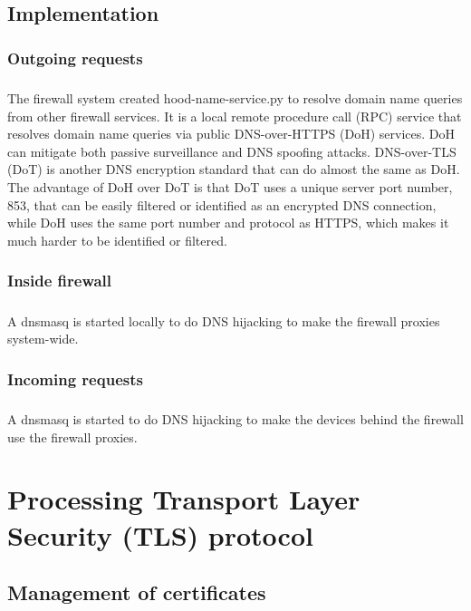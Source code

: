 \documentclass[mscthesis]{usiinfthesis}
\begin{document}
\section{Implementation}
\subsection{Outgoing requests}
\paragraph{}
The firewall system created hood-name-service.py to resolve domain name queries from other firewall services. It is a local remote procedure call (RPC) service that resolves domain name queries via public DNS-over-HTTPS (DoH) services. DoH can mitigate both passive surveillance and DNS spoofing attacks\citep{rfc:doh8}. DNS-over-TLS (DoT) is another DNS encryption standard that can do almost the same as DoH. The advantage of DoH over DoT is that DoT uses a unique server port number, 853, that can be easily filtered or identified as an encrypted DNS connection, while DoH uses the same port number and protocol as HTTPS, which makes it much harder to be identified or filtered.
\subsection{Inside firewall}
\paragraph{}
A dnsmasq is started locally to do DNS hijacking to make the firewall proxies system-wide.
\subsection{Incoming requests}
\paragraph{}
A dnsmasq is started to do DNS hijacking to make the devices behind the firewall use the firewall proxies.

\chapter{Processing Transport Layer Security (TLS) protocol}\label{cha:tls}

\section{Management of certificates}
\end{document}
